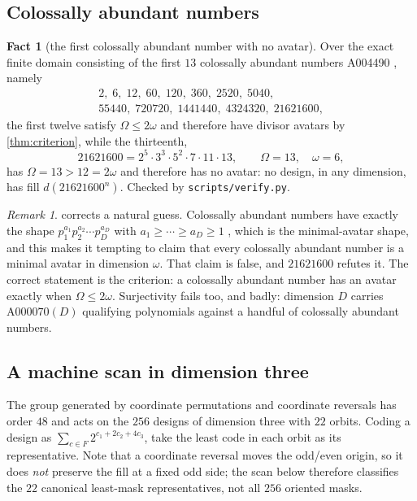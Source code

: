 \documentclass[11pt]{amsart}
\theoremstyle{definition}
\newtheorem{fact}[theorem]{Fact}
\theoremstyle{remark}
\newtheorem{remark}[theorem]{Remark}
\begin{document}
\subsection*{Colossally abundant numbers}

\begin{fact}[the first colossally abundant number with no avatar]
\label{fact:ca}
Over the exact finite domain consisting of the first $13$ colossally abundant numbers A004490 \cite{a004490}, namely
\begin{gather*}
  2,\; 6,\; 12,\; 60,\; 120,\; 360,\; 2520,\; 5040,\\
  55440,\; 720720,\; 1441440,\; 4324320,\; 21621600,
\end{gather*}
the first twelve satisfy $\Omega \le 2\omega$ and therefore have divisor avatars by \cref{thm:criterion}, while the thirteenth,
\[
  21621600 = 2^{5}\cdot 3^{3}\cdot 5^{2}\cdot 7 \cdot 11 \cdot 13, \qquad \Omega = 13, \quad \omega = 6,
\]
has $\Omega = 13 > 12 = 2\omega$ and therefore has no avatar: no design, in any dimension, has fill $d(21621600^{n})$. Checked by \texttt{scripts/verify.py}.
\end{fact}

\begin{remark}
\label{rem:ca}
 corrects a natural guess. Colossally abundant numbers have exactly the shape $p_{1}^{a_{1}}p_{2}^{a_{2}}\cdots p_{D}^{a_{D}}$ with $a_{1} \ge \cdots \ge a_{D} \ge 1$ \cite{alaogluerdos}, which is the minimal-avatar shape, and this makes it tempting to claim that every colossally abundant number is a minimal avatar in dimension $\omega$. That claim is false, and $21621600$ refutes it. The correct statement is the criterion: a colossally abundant number has an avatar exactly when $\Omega \le 2\omega$. Surjectivity fails too, and badly: dimension $D$ carries $\mathrm{A000070}(D)$ qualifying polynomials against a handful of colossally abundant numbers.
\end{remark}

\subsection*{A machine scan in dimension three}

The group generated by coordinate permutations and coordinate reversals has order $48$ and acts on the $256$ designs of dimension three with $22$ orbits. Coding a design as $\sum_{c \in F}2^{c_{1}+2c_{2}+4c_{3}}$, take the least code in each orbit as its representative. Note that a coordinate reversal moves the odd/even origin, so it does \emph{not} preserve the fill at a fixed odd side; the scan below therefore classifies the $22$ canonical least-mask representatives, not all $256$ oriented masks.
\end{document}
